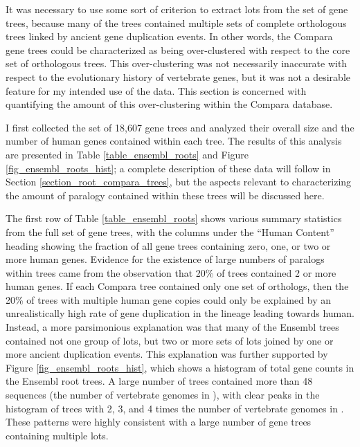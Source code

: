 It was necessary to use some sort of criterion to extract \acp{lot}
from the set of \cmp gene trees, because many of the \cmp trees
contained multiple sets of complete \mammln orthologous trees linked
by ancient gene duplication events. In other words, the Compara gene
trees could be characterized as being over-clustered with respect to
the core set of \mammln orthologous trees. This over-clustering was
not necessarily inaccurate with respect to the evolutionary history of
vertebrate genes, but it was not a desirable feature for my intended
use of the data. This section is concerned with quantifying the amount
of this over-clustering within the Compara database.

I first collected the set of 18,607 \cmp gene trees and analyzed their
overall size and the number of human genes contained within each
tree. The results of this analysis are presented in Table
\ref{table_ensembl_roots} and Figure \ref{fig_ensembl_roots_hist}; a
complete description of these data will follow in Section
\ref{section_root_compara_trees}, but the aspects relevant to
characterizing the amount of paralogy contained within these trees
will be discussed here.

The first row of Table \ref{table_ensembl_roots} shows various summary
statistics from the full set of \cmp gene trees, with the columns
under the ``Human Content'' heading showing the fraction of all gene
trees containing zero, one, or two or more human genes. Evidence for
the existence of large numbers of paralogs within \cmp trees came from
the observation that 20\% of \cmp trees contained 2 or more human
genes. If each Compara tree contained only one set of \mammln
orthologs, then the 20\% of trees with multiple human gene copies
could only be explained by an unrealistically high rate of gene
duplication in the lineage leading towards human. Instead, a more
parsimonious explanation was that many of the Ensembl trees contained
not one group of \mammln \acp{lot}, but two or more sets of \mammln
\acp{lot} joined by one or more ancient duplication events. This
explanation was further supported by Figure \ref{fig_ensembl_roots_hist},
which shows a histogram of total gene counts in the Ensembl root
trees. A large number of trees contained more than 48 sequences (the
number of vertebrate genomes in \ens), with clear peaks in the
histogram of trees with 2, 3, and 4 times the number of vertebrate
genomes in \ens. These patterns were highly consistent with a large
number of \cmp gene trees containing multiple \mammln \acp{lot}.

